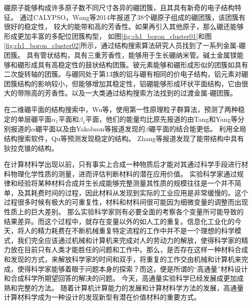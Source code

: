 硼原子能够构成许多原子数不同尺寸各异的硼团簇，且其具有新奇的电子结构特征。
通过CALYPSO，Wang等\cite{lv2014b38}2014年报道了38个硼原子组成的硼团簇，该团簇有很好的稳定性，
较大的能带和高的芳香性。如果再引入其他原子，那么硼还能够形成更加丰富的多配位团簇构型\cite{lv2015stabilization}，
如图\ref{fig:ch1_boron_cluster01}和图\ref{fig:ch1_boron_cluster02}所示，通过结构搜索算法研究人员找到了一系列金属-硼团簇。
\cite{dong2019li}具有管状结构，具有三重芳香性，能够用于生长硼纳米管。碱土金属镁能够和硼形成具有高稳定性的鼓状结构团簇\cite{tian2019exhaustive}。铍元素能够和硼形成形似的团簇如具有二次旋转轴的团簇\cite{kang2019probing}。与硼同处于第13族的铝与硼有相同的价电子结构，铝元素对硼团簇结构的影响较小，但能够增加其稳定性，铝硼能够形成环状平面结构\cite{jin2019structural}，它由很大的带隙高的芳香性。以及一大类通过结构搜索方法找到的过渡金属-硼团簇\cite{tian2019cluster}。

在二维硼平面的结构搜索中，Wu等\cite{wu2012two}，使用第一性原理粒子群算法，预测了两种稳定的单层硼平面$\alpha_1$平面和$\beta_1$平面，他们的能量均比原先报道的由Tang和Yang等\cite{tang2007novel,yang2008ab}分别报道的$\alpha$硼平面以及由Yakobson等\cite{penev2012polymorphism}报道发现的$\beta$硼平面的结合能更低。
利用全局结构搜索软件，Qu等预测发现稳定的结构。
Zhang等\cite{zhang2017dirac}报道发现了能带结构中具有狄拉克锥的结构。

在计算材料学出现以前，只有事实上合成一种物质后才能对其通过科学手段进行材料物理化学性质的测量，进而评估判断材料的潜在应用价值。
实验科学家通过规律和经验将某种材料合成并生长成能够完整测量其性质的规模往往是一个并不简单，及其耗费时间的过程，因此材料从发现到实际的工业应用是非常缓慢的。这个过程很多时候有极大的可重复性，材料和材料间很可能因为细微变量的调整而出现性质上的巨大差别。
那么实验科学家则有必要全面的考察各个变量所可能导致的结果差异。而这个过程中，就存在变量以外的如人工的重复。信息化工业化的今天，将人的精力耗费在不断机械重复特定流程的工作中并不是一个理想的科学模式，我们完全应该通过机械和计算机来完成对人的劳动力的解放，使得科学家的精力放在目前只有人类才能胜任的问题和工作中。那么，是否存在这样一种材料合成和发现的方式，来解放科学家的时间和双手，将重复的工作交由机械和计算机来完成，使得科学家能够着眼于问题本身的探索？而这，便是所谓的“高通量”材料设计和合成科学所期望回答的解决的问题。
今天，高通量实验科学已经发展成更加成熟和完整的方法\cite{curtarolo2003predicting, ceder1998identification, johannesson2002combined, curtarolo2005accuracy, xiang1995combinatorial, koinuma2004combinatorial, takeuchi2003identification}。
随着计算机计算能力的发展和计算材料学方法的发展，高通量计算材料学成为一种设计的发现新型有潜在价值材料的重要方式。

